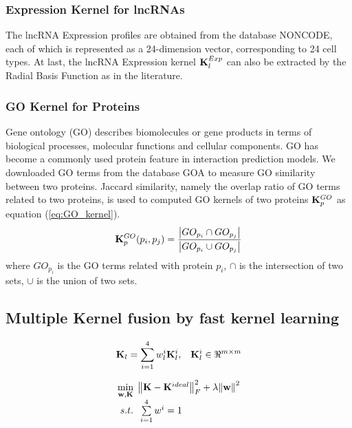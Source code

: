 \documentclass[fleqn,10pt]{wlscirep}
\begin{document}
\subsubsection*{Expression Kernel for lncRNAs}
The lncRNA Expression profiles are obtained from the database NONCODE, each of which is represented as a 24-dimension vector, corresponding to 24 cell types. At last, the lncRNA Expression kernel ${\bf{K}}_l^{Exp}$ can also be extracted by the Radial Basis Function as in the literature\cite{Buhmann2004RadialImplementations}.

\subsubsection*{GO Kernel for Proteins}
Gene ontology (GO) describes biomolecules or gene products in terms of biological processes, molecular functions and cellular components. GO has become a commonly used protein feature in interaction prediction models. We downloaded GO terms from the database GOA\cite{Wan2013} to measure GO similarity between two proteins. Jaccard similarity, namely the overlap ratio of GO terms related to two proteins, is used to computed GO kernels of two proteins ${\bf{K}}_p^{GO}$ as equation (\ref{eq:GO_kernel}).
\begin{equation}\label{eq:GO_kernel}
{\bf{K}}_p^{GO}({p_i},{p_j}) = \frac{{\left| {G{O_{{p_i}}} \cap G{O_{{p_j}}}} \right|}}{{\left| {G{O_{{p_i}}} \cup G{O_{{p_j}}}} \right|}}
\end{equation}
where ${G{O_{{p_i}}}}$ is the GO terms related with protein ${p_i}$, $ \cap $ is the intersection of two sets, $ \cup $ is the union of two sets.

\subsection*{Multiple Kernel fusion by fast kernel learning}
\begin{equation}
{{\bf{K}}_l} = \sum\limits_{i = 1}^4 {w_l^i} {\bf{K}}_l^i,\;\;\;{\bf{K}}_l^i \in {\Re ^{m \times m}}
\end{equation}

\begin{equation}
\begin{array}{l}
\mathop {\min }\limits_{{\bf{w,K}}} \;\left\| {{\bf{K}} - {{\bf{K}}^{ideal}}} \right\|_F^2 + \lambda {\left\| {\bf{w}} \right\|^2}\\
\;s.t.\;\;\sum\limits_{i = 1}^4 {{w^i}}  = 1
\end{array}
\end{equation}
\end{document}
